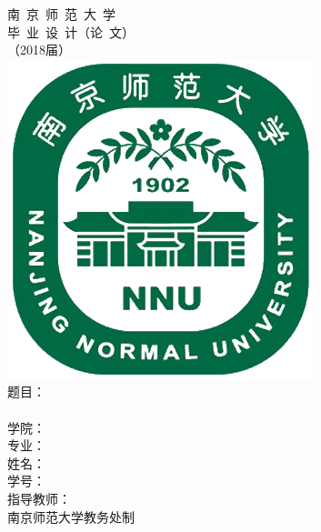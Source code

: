 \documentclass[a4paper]{ctexart}
\begin{document}
\pagestyle{empty}
\centering\vspace*{3ex}
	{\LARGE\lishu 南\ 京\ 师\ 范\ 大\ 学}\vspace{4ex}\\%
	{ \heiti 毕\  业\ 设\ 计（论\ 文）}\vspace{3ex}\\ %
	{\Huge\heiti （2018届）}\\\vspace{8ex}%
	\includegraphics[scale=.35]{Nanjing_Normal_University_logo}\vspace{8ex}\\ 
	{\Large
		{\heiti 题\phantom{题目}目：}\uline{}\medskip\\
		\hspace{2.6cm}\uline{}\medskip\\
		{\heiti 学\phantom{学院}院：}\uline{}\medskip\\
		{\heiti 专\phantom{专业}业：}\uline{}\medskip\\
		{\heiti 姓\phantom{姓名}名：}\uline{}\medskip\\
		{\heiti 学\phantom{学号}号：}\uline{}\medskip\\
		{\heiti 指导教师：}\uline{}\\\vspace{8ex}
		{\heiti 南京师范大学教务处\phantom{空}制}
	}
\end{document}
